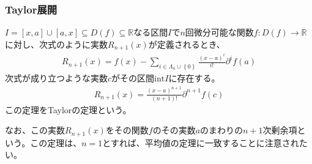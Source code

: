 \documentclass[dvipdfmx]{jsarticle}
\begin{document}
\subsubsection{Taylor展開}%
\begin{thm}[Taylorの定理]\label{4.2.2.12}
$I = [ x,a] \cup [ a,x] \subseteq D(f) \subseteq \mathbb{R}$なる区間$I$で$n$回微分可能な関数$f:D(f) \rightarrow \mathbb{R}$に対し、次式のように実数$R_{n + 1}(x)$が定義されるとき、
\begin{align*}
R_{n + 1}(x) = f(x) - \sum_{i \in \varLambda_{n} \cup \left\{ 0 \right\}} {\frac{(x - a)^{i}}{i!}\partial^{i}f(a)}
\end{align*}
次式が成り立つような実数$c$がその区間$\mathrm{int}I$に存在する。
\begin{align*}
R_{n + 1}(x) = \frac{(x - a)^{n + 1}}{(n + 1)!}\partial^{n + 1}f(c)
\end{align*}
この定理をTaylorの定理という。
\end{thm}\par
なお、この実数$R_{n + 1}(x)$をその関数$f$のその実数$a$のまわりの$n + 1$次剰余項という。この定理は、$n = 1$とすれば、平均値の定理に一致することに注意されたい。
\end{document}
